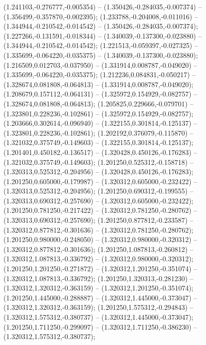  (1.241103,-0.276777,-0.005354) -- (1.350426,-0.284035,-0.007374) -- (1.356499,-0.357870,-0.002395);
 (1.233788,-0.204008,-0.011016) -- (1.344944,-0.210542,-0.014542) -- (1.350426,-0.284035,-0.007374);
 (1.227266,-0.131591,-0.018344) -- (1.340039,-0.137300,-0.023880) -- (1.344944,-0.210542,-0.014542);
 (1.221513,-0.059397,-0.027325) -- (1.335699,-0.064220,-0.035375) -- (1.340039,-0.137300,-0.023880);
 (1.216509,0.012703,-0.037950) -- (1.331914,0.008787,-0.049020) -- (1.335699,-0.064220,-0.035375);
 (1.212236,0.084831,-0.050217) -- (1.328674,0.081808,-0.064813) -- (1.331914,0.008787,-0.049020);
 (1.208679,0.157112,-0.064131) -- (1.325972,0.154929,-0.082757) -- (1.328674,0.081808,-0.064813);
 (1.205825,0.229666,-0.079701) -- (1.323801,0.228236,-0.102861) -- (1.325972,0.154929,-0.082757);
 (1.203666,0.302614,-0.096940) -- (1.322155,0.301814,-0.125137) -- (1.323801,0.228236,-0.102861);
 (1.202192,0.376079,-0.115870) -- (1.321032,0.375749,-0.149603) -- (1.322155,0.301814,-0.125137);
 (1.201401,0.450182,-0.136517) -- (1.320428,0.450126,-0.176283) -- (1.321032,0.375749,-0.149603);
 (1.201250,0.525312,-0.158718) -- (1.320313,0.525312,-0.204956) -- (1.320428,0.450126,-0.176283);
 (1.201250,0.605000,-0.179987) -- (1.320312,0.605000,-0.232422) -- (1.320313,0.525312,-0.204956);
 (1.201250,0.690312,-0.199555) -- (1.320313,0.690312,-0.257690) -- (1.320312,0.605000,-0.232422);
 (1.201250,0.781250,-0.217422) -- (1.320312,0.781250,-0.280762) -- (1.320313,0.690312,-0.257690);
 (1.201250,0.877812,-0.233587) -- (1.320312,0.877812,-0.301636) -- (1.320312,0.781250,-0.280762);
 (1.201250,0.980000,-0.248050) -- (1.320312,0.980000,-0.320312) -- (1.320312,0.877812,-0.301636);
 (1.201250,1.087813,-0.260812) -- (1.320312,1.087813,-0.336792) -- (1.320312,0.980000,-0.320312);
 (1.201250,1.201250,-0.271872) -- (1.320312,1.201250,-0.351074) -- (1.320312,1.087813,-0.336792);
 (1.201250,1.320313,-0.281230) -- (1.320312,1.320312,-0.363159) -- (1.320312,1.201250,-0.351074);
 (1.201250,1.445000,-0.288887) -- (1.320312,1.445000,-0.373047) -- (1.320312,1.320312,-0.363159);
 (1.201250,1.575312,-0.294843) -- (1.320312,1.575312,-0.380737) -- (1.320312,1.445000,-0.373047);
 (1.201250,1.711250,-0.299097) -- (1.320312,1.711250,-0.386230) -- (1.320312,1.575312,-0.380737);
